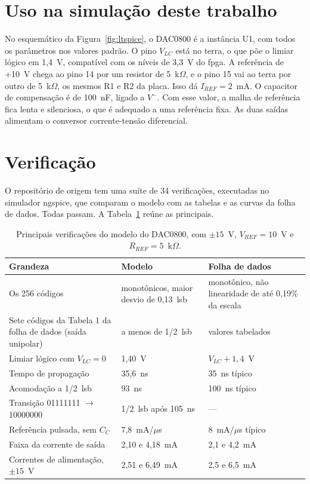 \section{Uso na simulação deste trabalho}

No esquemático da Figura~\ref{fig:ltspice}, o DAC0800 é a instância U1, com todos os parâmetros nos valores padrão. O pino \(V_{LC}\) está no terra, o que põe o limiar lógico em 1,4~V, compatível com os níveis de 3,3~V do \ac{fpga}. A referência de +10~V chega ao pino 14 por um resistor de 5~k\(\Omega\), e o pino 15 vai ao terra por outro de 5~k\(\Omega\), os mesmos R1 e R2 da placa. Isso dá \(I_{REF} = 2\)~mA. O capacitor de compensação é de 100~nF, ligado a \(V^-\). Com esse valor, a malha de referência fica lenta e silenciosa, o que é adequado a uma referência fixa. As duas saídas alimentam o conversor corrente-tensão diferencial.

\section{Verificação}

O repositório de origem tem uma suíte de 34 verificações, executadas no simulador ngspice, que comparam o modelo com as tabelas e as curvas da folha de dados. Todas passam. A Tabela~\ref{tab:verificacao_dac0800} reúne as principais.

\begin{table}
	\caption{Principais verificações do modelo do DAC0800, com \(\pm15\)~V, \(V_{REF} = 10\)~V e \(R_{REF} = 5\)~k\(\Omega\).}
	\label{tab:verificacao_dac0800}
	\begin{tabular}{p{} p{} p{}}\toprule
		Grandeza & Modelo & Folha de dados\\\midrule
		Os 256 códigos & monotônicos, maior desvio de 0,13~\acs{lsb} & monotônico, não linearidade de até 0,19\% da escala\\
		Sete códigos da Tabela 1 da folha de dados (saída unipolar) & a menos de 1/2~\acs{lsb} & valores tabelados\\
		Limiar lógico com \(V_{LC} = 0\) & 1,40~V & \(V_{LC} + 1{,}4\)~V\\
		Tempo de propagação & 35,6~ns & 35~ns típico\\
		Acomodação a 1/2~\acs{lsb} & 93~ns & 100~ns típico\\
		Transição 01111111 \(\rightarrow\) 10000000 & 1/2~\acs{lsb} após 105~ns & ---\\
		Referência pulsada, sem \(C_C\) & 7,8~mA/\(\mu\)s & 8~mA/\(\mu\)s típico\\
		Faixa da corrente de saída & 2,10 e 4,18~mA & 2,1 e 4,2~mA\\
		Correntes de alimentação, \(\pm15\)~V & 2,51 e 6,49~mA & 2,5 e 6,5~mA\\\bottomrule
	\end{tabular}
\end{table}

